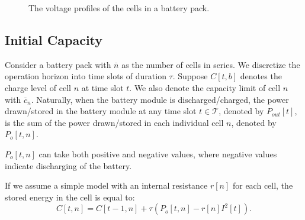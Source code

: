 \documentclass[10pt,twocolumn]{IEEEtran}
\begin{document}
\begin{figure}[t]
\centering
\vspace{-0.2cm}
{} \vspace{-0.2cm}
\caption{The voltage profiles of the cells in a battery pack.}
\vspace{-0.3cm}
\label{fig:packoperation}
\end{figure}

\subsection{Initial Capacity}
Consider a battery pack with $\overline{n}$  as the number of cells in series. 
We discretize the operation horizon into time slots of duration $\tau$.
Suppose $C[t, b]$ denotes the charge level of cell $n$ at time slot $t$.
We also denote the capacity limit of cell $n$ with $\overline{c}_n$.
Naturally, when the battery module is discharged/charged,  the power drawn/stored in the battery module at any time slot $t \in \mathcal{T}$, denoted by $P_{out}[t]$,  is the sum of the power drawn/stored in each individual cell $n$, denoted by $P_{o}[t,n]$.

$P_{o}[t,n]$ can take both positive and negative values, where negative values indicate discharging of the battery.


If we assume a simple model with an internal resistance $r[n]$ for each cell, the stored energy in the cell is equal to:
%
\begin{equation}
C[t,n]=C[t-1,n] +  \tau(P_{o}[t,n] - r[n]I^2[t]).
\label{energycell}
\end{equation}
\end{document}
